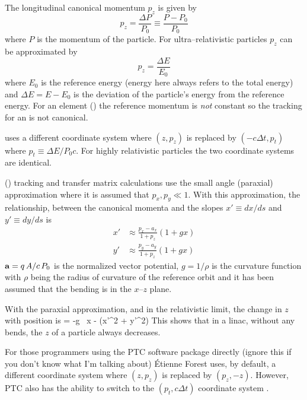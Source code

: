 The longitudinal canonical momentum $p_z$ is given by
\begin{equation}
  p_z = \frac{\Delta P}{P_0} \equiv \frac{P - P_0}{P_0}
\end{equation}
where $P$ is the momentum of the particle. For ultra--relativistic particles
$p_z$ can be approximated by
\begin{equation}
  p_z = \frac{\Delta E}{E_0}
\end{equation}
where $E_0$ is the reference energy (energy here always refers to the
total energy) and $\Delta E = E - E_0$ is the deviation of the
particle's energy from the reference energy. For an 
element () the reference momentum is {\it not} constant
so the tracking for an  is not canonical.


\mad uses a different coordinate system where $(z, p_z)$ is
replaced by $(-c\Delta t, p_t)$ where $p_t \equiv \Delta E / P_0
c$. For highly relativistic particles the two coordinate systems are
identical.

 () tracking and transfer matrix
calculations use the small angle (paraxial) approximation where it is
assumed that $p_x, p_y \ll 1$. With this approximation, the
relationship, between the canonical momenta and the slopes $x' \equiv
dx/ds$ and $y' \equiv dy/ds$ is
\begin{align}
  x' &\approx \frac{p_x - a_x}{1 + p_z} (1 + g x) \\
  y' &\approx \frac{p_y - a_y}{1 + p_z} (1 + g x) 
  \label{xpa1p}
\end{align}
${\bf a} = q \, A / c \, P_0$ is the normalized vector potential, $g =
1/\rho$ is the curvature function with $\rho$ being the radius of
curvature of the reference orbit and it has been assumed that the
bending is in the $x$--$z$ plane. 

With the paraxial approximation, and in the relativistic limit, the
change in $z$ with position is
\Begineq
   = -g \, x -  (x'^2 + y'^2)
\Endeq
This shows that in a linac, without any bends, the $z$ of a particle
always decreases.

For those programmers using the PTC
software package directly (ignore
this if you don't know what I'm talking about) \'Etienne Forest uses,
by default, a different coordinate system where $(z, p_z)$ is replaced
by $(p_z, -z)$. However, PTC also has the ability to switch to the
$(p_t, c \Delta t)$ coordinate system .
